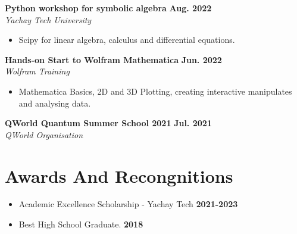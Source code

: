 \documentclass[a4paper,12pt]{article}
\begin{document}
\textbf{Python workshop for symbolic algebra} \hfill {\textbf{Aug. 2022}}\\
\emph{Yachay Tech University}
\begin{itemize}
    \item Scipy for linear algebra, calculus and differential equations.
\end{itemize}

\textbf{Hands-on Start to Wolfram Mathematica} \hfill {\textbf{Jun. 2022}}\\
\emph{Wolfram Training}
\begin{itemize}
    \item Mathematica Basics, 2D and 3D Plotting, creating interactive manipulates 
        and analysing data.
\end{itemize}

\textbf{QWorld Quantum Summer School 2021} \hfill {\textbf{Jul. 2021}}\\
\emph{QWorld Organisation}


\section{Awards And Recongnitions}
\begin{itemize}
    \item   Academic Excellence Scholarship - Yachay Tech  \hfill {\textbf{2021-2023}}
    \item Best High School Graduate. \hfill {\textbf{2018}}
\end{itemize}




\begin{comment}
\begin{tabularx}{\linewidth}{ @{}l r@{} }
\textbf{Some Project} & \hfill \href{https://some-link.com}{Link to Demo} \\[3.75pt]
\multicolumn{2}{@{}X@{}}{long long line of blah blah that will wrap when the table fills the column width long long line of blah blah that will wrap when the table fills the column width long long line of blah blah that will wrap when the table fills the column width long long line of blah blah that will wrap when the table fills the column width}  \\
\end{tabularx}
\end{comment}
\end{document}
